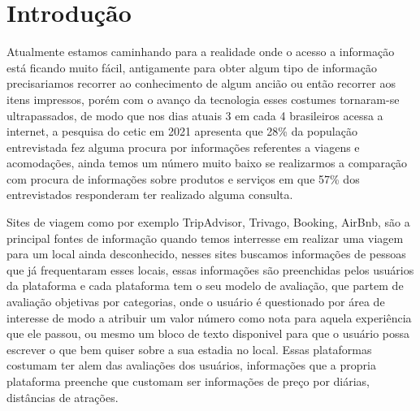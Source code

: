 
\chapter[Introdução]{Introdução}
\label{cap:intro}

\begin{comment}
Neste capítulo precisamos:
\begin{itemize}
    \item Introduzir o contexto
    \item Definir o que entendemos como avaliação de hoteis
    \item Apresentar em linhas gerais quais métodos são usados para detectar fake news, qual o estada da arte atual e quais são suas limitações.
    \item Descrever a nossa proposta e objetivos
    \item Descrever a estrutura do relatório
\end{itemize}

\end{comment}

Atualmente estamos caminhando para a realidade onde o acesso a informação está ficando muito fácil, antigamente para obter algum tipo de informação precisariamos recorrer ao conhecimento de algum ancião ou então recorrer aos itens impressos, porém com o avanço da tecnologia esses costumes tornaram-se ultrapassados, de modo que nos dias atuais 3 em cada 4 brasileiros acessa a internet, a pesquisa do cetic em 2021 apresenta que 28\% da população entrevistada fez alguma procura por informações referentes a viagens e acomodações, ainda temos um número muito baixo se realizarmos a comparação com procura de informações sobre produtos e serviços em que 57\% dos entrevistados responderam ter realizado alguma consulta.

Sites de viagem como por exemplo TripAdvisor, Trivago, Booking, AirBnb, são a principal fontes de informação quando temos interresse em realizar uma viagem para um local ainda desconhecido, nesses sites buscamos informações de pessoas que já frequentaram esses locais, essas informações são preenchidas pelos usuários da plataforma e cada plataforma tem o seu modelo de avaliação, que partem de avaliação objetivas por categorias, onde o usuário é questionado por área de interesse de modo a atribuir um valor número como nota para aquela experiência que ele passou, ou mesmo um bloco de texto disponivel para que o usuário possa escrever o que bem quiser sobre a sua estadia no local. Essas plataformas costumam ter alem das avaliações dos usuários, informações que a propria plataforma preenche que customam ser informações de preço por diárias, distâncias de atrações.

